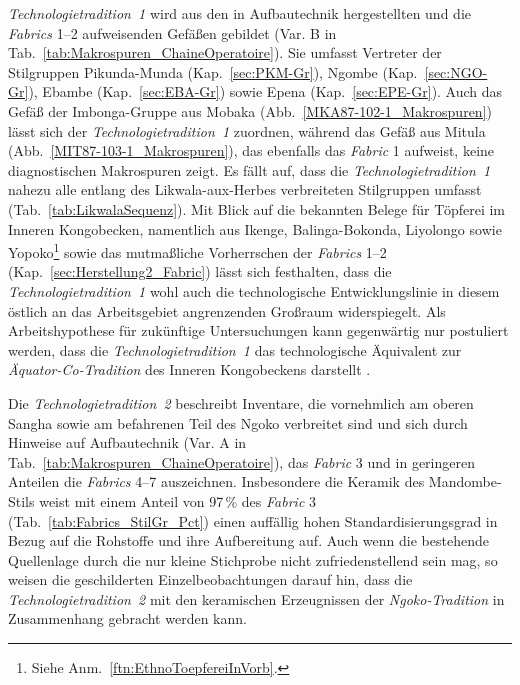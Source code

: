 \textit{Technologietradition~1} wird aus den in Aufbautechnik hergestellten und die \textit{Fabrics} 1--2 aufweisenden Gefäßen gebildet (Var. B in Tab.~\ref{tab:Makrospuren_ChaineOperatoire}). Sie umfasst Vertreter der Stilgruppen Pikunda-Munda (Kap.~\ref{sec:PKM-Gr}), Ngombe (Kap.~\ref{sec:NGO-Gr}), Ebambe (Kap.~\ref{sec:EBA-Gr}) sowie Epena (Kap.~\ref{sec:EPE-Gr}). Auch das Gefäß der Imbonga-Gruppe aus Mobaka (Abb.~\ref{MKA87-102-1_Makrospuren}) lässt sich der \textit{Technologietradition~1} zuordnen, während das Gefäß aus Mitula (Abb.~\ref{MIT87-103-1_Makrospuren}), das ebenfalls das \textit{Fabric} 1 aufweist, keine diagnostischen Makrospuren zeigt. Es fällt auf, dass die \textit{Technologietradition~1} nahezu alle entlang des \mbox{Likwala}-\mbox{aux}-\mbox{Herbes} verbreiteten Stilgruppen umfasst (Tab.~\ref{tab:LikwalaSequenz}). Mit Blick auf die bekannten Belege für Töpferei im Inneren Kongobecken, namentlich aus Ikenge, Balinga-Bokonda, Liyolongo sowie Yopoko\footnote{Siehe Anm.~\ref{ftn:EthnoToepfereiInVorb}.} sowie das mutmaßliche Vorherrschen der \textit{Fabrics} 1--2 (Kap.~\ref{sec:Herstellung2_Fabric}) lässt sich festhalten, dass die \textit{Technologietradition~1} wohl auch die technologische Entwicklungslinie in diesem östlich an das Arbeitsgebiet angrenzenden Großraum widerspiegelt. Als Arbeitshypothese für zukünftige Untersuchungen kann gegenwärtig nur postuliert werden, dass die \textit{Technologietradition~1} das technologische Äquivalent zur \textit{Äquator-Co-Tradition} des Inneren Kongobeckens darstellt \parencite[Kap.~\ref{sec:ICB_StilGrDatierungen},][222 Abb.~4]{Wotzka.1995}.

Die \textit{Technologietradition~2} beschreibt Inventare, die vornehmlich am oberen \mbox{Sangha} sowie am befahrenen Teil des \mbox{Ngoko} verbreitet sind und sich durch Hinweise auf Aufbautechnik (Var. A in Tab.~\ref{tab:Makrospuren_ChaineOperatoire}), das \textit{Fabric} 3 und in geringeren Anteilen die \textit{Fabrics} 4--7 auszeichnen. Insbesondere die Keramik des  Mandombe-Stils weist mit einem Anteil von 97\,\% des \textit{Fabric} 3 (Tab.~\ref{tab:Fabrics_StilGr_Pct}) einen auffällig hohen Standardisierungsgrad in Bezug auf die Rohstoffe und ihre Aufbereitung auf. Auch wenn die bestehende Quellenlage durch die nur kleine Stichprobe nicht zufriedenstellend sein mag, so weisen die geschilderten Einzelbeobachtungen darauf hin, dass die \textit{Technologietradition~2} mit den keramischen Erzeugnissen der \textit{\mbox{Ngoko}-Tradition} in Zusammenhang gebracht werden kann.

